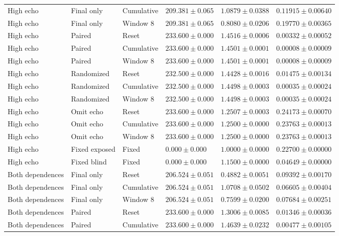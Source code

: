 \begin{longtable}{@{}llllll@{}}
High echo & Final only & Cumulative & $209.381 \pm 0.065$ & $1.0879 \pm 0.0388$ & $0.11915 \pm 0.00640$ \\
High echo & Final only & Window 8 & $209.381 \pm 0.065$ & $0.8080 \pm 0.0206$ & $0.19770 \pm 0.00365$ \\
High echo & Paired & Reset & $233.600 \pm 0.000$ & $1.4516 \pm 0.0006$ & $0.00332 \pm 0.00052$ \\
High echo & Paired & Cumulative & $233.600 \pm 0.000$ & $1.4501 \pm 0.0001$ & $0.00008 \pm 0.00009$ \\
High echo & Paired & Window 8 & $233.600 \pm 0.000$ & $1.4501 \pm 0.0001$ & $0.00008 \pm 0.00009$ \\
High echo & Randomized & Reset & $232.500 \pm 0.000$ & $1.4428 \pm 0.0016$ & $0.01475 \pm 0.00134$ \\
High echo & Randomized & Cumulative & $232.500 \pm 0.000$ & $1.4498 \pm 0.0003$ & $0.00035 \pm 0.00024$ \\
High echo & Randomized & Window 8 & $232.500 \pm 0.000$ & $1.4498 \pm 0.0003$ & $0.00035 \pm 0.00024$ \\
High echo & Omit echo & Reset & $233.600 \pm 0.000$ & $1.2507 \pm 0.0003$ & $0.24173 \pm 0.00070$ \\
High echo & Omit echo & Cumulative & $233.600 \pm 0.000$ & $1.2500 \pm 0.0000$ & $0.23763 \pm 0.00013$ \\
High echo & Omit echo & Window 8 & $233.600 \pm 0.000$ & $1.2500 \pm 0.0000$ & $0.23763 \pm 0.00013$ \\
High echo & Fixed exposed & Fixed & $0.000 \pm 0.000$ & $1.0000 \pm 0.0000$ & $0.22700 \pm 0.00000$ \\
High echo & Fixed blind & Fixed & $0.000 \pm 0.000$ & $1.1500 \pm 0.0000$ & $0.04649 \pm 0.00000$ \\
Both dependences & Final only & Reset & $206.524 \pm 0.051$ & $0.4882 \pm 0.0051$ & $0.09392 \pm 0.00170$ \\
Both dependences & Final only & Cumulative & $206.524 \pm 0.051$ & $1.0708 \pm 0.0502$ & $0.06605 \pm 0.00404$ \\
Both dependences & Final only & Window 8 & $206.524 \pm 0.051$ & $0.7599 \pm 0.0200$ & $0.07684 \pm 0.00251$ \\
Both dependences & Paired & Reset & $233.600 \pm 0.000$ & $1.3006 \pm 0.0085$ & $0.01346 \pm 0.00036$ \\
Both dependences & Paired & Cumulative & $233.600 \pm 0.000$ & $1.4639 \pm 0.0232$ & $0.00477 \pm 0.00105$ \\

\end{longtable}
